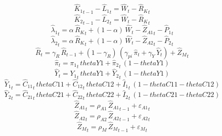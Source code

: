 \begin{dmath}
{{\hat{K}_{1}}}_{t-1}-{{\hat{L}_{1}}}_{t}={{\hat{W}}}_{t}-{{\hat{R}_{K}}}_{t}
\end{dmath}
\begin{dmath}
{{\hat{K}_{2}}}_{t-1}-{{\hat{L}_{2}}}_{t}={{\hat{W}}}_{t}-{{\hat{R}_{K}}}_{t}
\end{dmath}
\begin{dmath}
{{\hat{\lambda}_{1}}}_{t}={{\alpha}}\, {{\hat{R}_{K}}}_{t}+\left(1-{{\alpha}}\right)\, {{\hat{W}}}_{t}-{{\hat{Z}_{A1}}}_{t}-{{\hat{P}_{1}}}_{t}
\end{dmath}
\begin{dmath}
{{\hat{\lambda}_{2}}}_{t}={{\alpha}}\, {{\hat{R}_{K}}}_{t}+\left(1-{{\alpha}}\right)\, {{\hat{W}}}_{t}-{{\hat{Z}_{A2}}}_{t}-{{\hat{P}_{2}}}_{t}
\end{dmath}
\begin{dmath}
{{\hat{R}}}_{t}={{\gamma_{R}}}\, {{\hat{R}}}_{t-1}+\left(1-{{\gamma_{R}}}\right)\, \left({{\gamma_{pi}}}\, {{\hat{\pi}}}_{t}+{{\gamma_{Y}}}\, {{\hat{Y}}}_{t}\right)+{{\hat{Z}_M}}_{t}
\end{dmath}
\begin{dmath}
{{\hat{\pi}}}_{t}={{\hat{\pi}_{1}}}_{t}\, {thetaY1}+{{\hat{\pi}_{2}}}_{t}\, \left(1-{thetaY1}\right)
\end{dmath}
\begin{dmath}
{{\hat{Y}}}_{t}={{\hat{Y}_{1}}}_{t}\, {thetaY1}+{{\hat{Y}_{2}}}_{t}\, \left(1-{thetaY1}\right)
\end{dmath}
\begin{dmath}
{{\hat{Y}_{1}}}_{t}={{\hat{C}_{1 1}}}_{t}\, {thetaC11}+{{\hat{C}_{1 2}}}_{t}\, {thetaC12}+{{\hat{I}_{1}}}_{t}\, \left(1-{thetaC11}-{thetaC12}\right)
\end{dmath}
\begin{dmath}
{{\hat{Y}_{2}}}_{t}={{\hat{C}_{2 1}}}_{t}\, {thetaC21}+{{\hat{C}_{2 2}}}_{t}\, {thetaC22}+{{\hat{I}_{2}}}_{t}\, \left(1-{thetaC21}-{thetaC22}\right)
\end{dmath}
\begin{dmath}
{{\hat{Z}_{A1}}}_{t}={{\rho_{A1}}}\, {{\hat{Z}_{A1}}}_{t-1}+{{\varepsilon_{A1}}}_{t}
\end{dmath}
\begin{dmath}
{{\hat{Z}_{A2}}}_{t}={{\rho_{A2}}}\, {{\hat{Z}_{A2}}}_{t-1}+{{\varepsilon_{A2}}}_{t}
\end{dmath}
\begin{dmath}
{{\hat{Z}_M}}_{t}={{\rho_{M}}}\, {{\hat{Z}_M}}_{t-1}+{{\varepsilon_{M}}}_{t}
\end{dmath}
